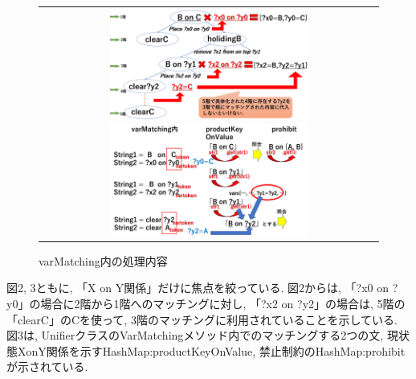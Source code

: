 \documentclass[12pt]{jarticle}
\begin{document}
\begin{figure}[htpb]
  \centering
    \begin{tabular}{c} 
      \begin{minipage}{0.50\hsize}
        \centering
          \includegraphics[width = 6.5cm, pagebox = cropbox, clip]
                          {images/treeSupplement.pdf}
                          \caption{階層的な視点}
                          \label{fig:1.3}
      \end{minipage}
 
      \begin{minipage}{0.50\hsize}
        \centering
          \includegraphics[width = 6.5cm, pagebox = cropbox, clip]
                          {images/varMatching.pdf}
                          \caption{varMatching内の処理内容}
                          \label{fig:1.3}
      \end{minipage} \\ 
    \end{tabular}
\end{figure}     

図2, 3ともに, 「X on Y関係」だけに焦点を絞っている. 図2からは, 「?x0 on ?y0」の場合に2階から1階へのマッチングに対し, 「?x2 on ?y2」の場合は, 5階の「clearC」のCを使って, 3階のマッチングに利用されていることを示している. 図3は, UnifierクラスのVarMatchingメソッド内でのマッチングする2つの文, 現状態XonY関係を示すHashMap:productKeyOnValue, 禁止制約のHashMap:prohibitが示されている. \\
\end{document}
